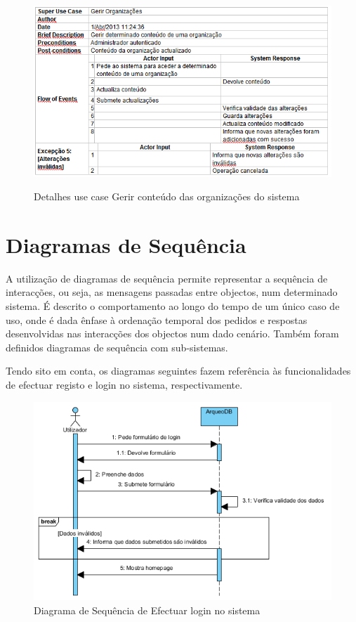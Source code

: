 ﻿\documentclass[12pt,a4paper]{article}
\begin{document}
\begin{figure}[h!]
\centering
\includegraphics[scale=0.7]{d_usecase/A_gerirconteudo}
\label{usecase}
\caption{Detalhes use case Gerir conteúdo das organizações do sistema} 
\end{figure}


\clearpage
\section{Diagramas de Sequência}
A utilização de diagramas de sequência permite representar a sequência de interacções, ou
seja, as mensagens passadas entre objectos, num determinado sistema. É descrito o comportamento
ao longo do tempo de um único caso de uso, onde é dada ênfase à ordenação temporal dos pedidos e respostas desenvolvidas nas interacções dos objectos num dado cenário. Também foram definidos diagramas de sequência com sub-sistemas.

Tendo sito em conta, os diagramas seguintes fazem referência às funcionalidades de efectuar registo e login no sistema, respectivamente.\\

\begin{figure}[h!]
\centering
\includegraphics[scale=1]{sequencia/login}
\caption{Diagrama de Sequência de Efectuar login no sistema} 
\end{figure}
\end{document}
